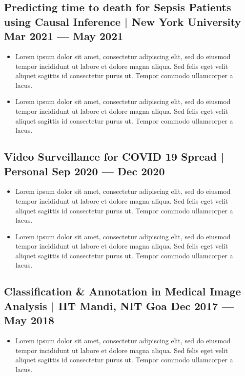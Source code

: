 \documentclass[a4,10pt]{article}
\newenvironment{zitemize}{
\begin{itemize}\itemsep0pt \parskip0pt \parsep1pt}
{\end{itemize}\vspace{-0.5cm}}
\begin{document}
\subsection*{Predicting time to death for Sepsis Patients using Causal Inference  | New York University \hfill Mar 2021 --- May 2021} 
    \begin{zitemize}
          \item { Lorem ipsum dolor sit amet, consectetur adipiscing elit, sed do eiusmod tempor incididunt ut labore et dolore magna aliqua. Sed felis eget velit aliquet sagittis id consectetur purus ut. Tempor commodo ullamcorper a lacus. }
         \item {Lorem ipsum dolor sit amet, consectetur adipiscing elit, sed do eiusmod tempor incididunt ut labore et dolore magna aliqua. Sed felis eget velit aliquet sagittis id consectetur purus ut. Tempor commodo ullamcorper a lacus.}
         
        
    \end{zitemize}
\subsection*{Video Surveillance for COVID 19 Spread | Personal  \hfill Sep 2020 --- Dec 2020} 
    \begin{zitemize}
         \item { Lorem ipsum dolor sit amet, consectetur adipiscing elit, sed do eiusmod tempor incididunt ut labore et dolore magna aliqua. Sed felis eget velit aliquet sagittis id consectetur purus ut. Tempor commodo ullamcorper a lacus. }
         \item {Lorem ipsum dolor sit amet, consectetur adipiscing elit, sed do eiusmod tempor incididunt ut labore et dolore magna aliqua. Sed felis eget velit aliquet sagittis id consectetur purus ut. Tempor commodo ullamcorper a lacus.}
        
        
    \end{zitemize}


\subsection*{Classification \& Annotation in Medical Image Analysis |  IIT Mandi, NIT Goa \hfill Dec 2017 --- May 2018} 
    \begin{zitemize}
        \item { Lorem ipsum dolor sit amet, consectetur adipiscing elit, sed do eiusmod tempor incididunt ut labore et dolore magna aliqua. Sed felis eget velit aliquet sagittis id consectetur purus ut. Tempor commodo ullamcorper a lacus. }
        
        
        
    \end{zitemize}
\end{document}
